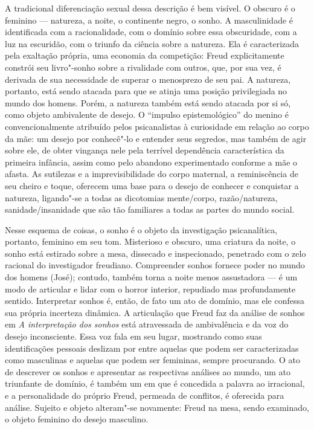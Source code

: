 A tradicional diferenciação sexual dessa descrição é bem visível. O
obscuro é o feminino --- natureza, a noite, o continente negro, o sonho.
A masculinidade é identificada com a racionalidade, com o domínio sobre
essa obscuridade, com a luz na escuridão, com o triunfo da ciência sobre
a natureza. Ela é caracterizada pela exaltação própria, uma economia da
competição: Freud explicitamente constrói seu livro"-sonho sobre a
rivalidade com outros, que, por sua vez, é derivada de sua necessidade
de superar o menosprezo de seu pai. A natureza, portanto, está sendo
atacada para que se atinja uma posição privilegiada no mundo dos homens.
Porém, a natureza também está sendo atacada por si só, como objeto
ambivalente de desejo. O ``impulso epistemológico'' do menino é
convencionalmente atribuído pelos psicanalistas à curiosidade em relação
ao corpo da mãe: um desejo por conhecê"-lo e entender seus segredos, mas
também de agir sobre ele, de obter vingança nele pela terrível
dependência característica da primeira infância, assim como pelo
abandono experimentado conforme a mãe o afasta. As sutilezas e a
imprevisibilidade do corpo maternal, a reminiscência de seu cheiro e
toque, oferecem uma base para o desejo de conhecer e conquistar a
natureza, ligando"-se a todas as dicotomias mente/corpo, razão/natureza,
sanidade/insanidade que são tão familiares a todas as partes do mundo
social.

Nesse esquema de coisas, o sonho é o objeto da investigação
psicanalítica, portanto, feminino em seu tom. Misterioso e obscuro, uma
criatura da noite, o sonho está estirado sobre a mesa, dissecado e
inspecionado, penetrado com o zelo racional do investigador freudiano.
Compreender sonhos fornece poder no mundo dos homens (José); contudo,
também torna a noite menos assustadora --- é um modo de articular e lidar
com o horror interior, repudiado mas profundamente sentido. Interpretar
sonhos é, então, de fato um ato de domínio, mas ele confessa sua própria
incerteza dinâmica. A articulação que Freud faz da análise de sonhos em
\emph{A interpretação dos sonhos} está atravessada de ambivalência e da
voz do desejo inconsciente. Essa voz fala em seu lugar, mostrando como
suas identificações pessoais deslizam por entre aquelas que podem ser
caracterizadas como masculinas e aquelas que podem ser femininas, sempre
procurando. O ato de descrever os sonhos e apresentar as respectivas
análises ao mundo, um ato triunfante de domínio, é também um em que é
concedida a palavra ao irracional, e a personalidade do próprio Freud,
permeada de conflitos, é oferecida para análise. Sujeito e objeto
alteram"-se novamente: Freud na mesa, sendo examinado, o objeto feminino
do desejo masculino.

